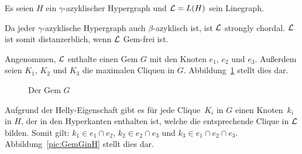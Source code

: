 \begin{Proof}
    Es seien $H$ ein $\gamma$-azyklischer Hypergraph und $\mathcal{L}=L(H)$ sein Linegraph.
    
    Da jeder $\gamma$-azyklische Hypergraph auch $\beta$-azyklisch ist, ist $\mathcal{L}$ strongly chordal. $\mathcal{L}$ ist somit distanzerblich, wenn $\mathcal{L}$ Gem-frei ist.
    
    Angenommen, $\mathcal{L}$ enthalte einen Gem $G$ mit den Knoten $e_1$, $e_2$ und $e_3$. Außerdem seien $K_1$, $K_2$ und $K_3$ die maximalen Cliquen in $G$. Abbildung~\ref{pic:GemGinL} stellt dies dar.

    \begin{figure}[htbp]
        \centering
        \caption{Der Gem $G$}
        \label{pic:GemGinL}
    \end{figure}

    
    Aufgrund der Helly-Eigenschaft gibt es für jede Clique~$K_i$ in $G$ einen Knoten~$k_i$ in $H$, der in den Hyperkanten enthalten ist, welche die entsprechende Clique in $\mathcal{L}$ bilden. Somit gilt: $k_1 \in e_1 \cap e_2$, $k_2 \in e_2 \cap e_3$ und $k_3 \in e_1 \cap e_2 \cap e_3$. Abbildung~\ref{pic:GemGinH} stellt dies dar.
    
    \begin{figure}[htbp]
        \centering
\end{figure}
\end{Proof}
